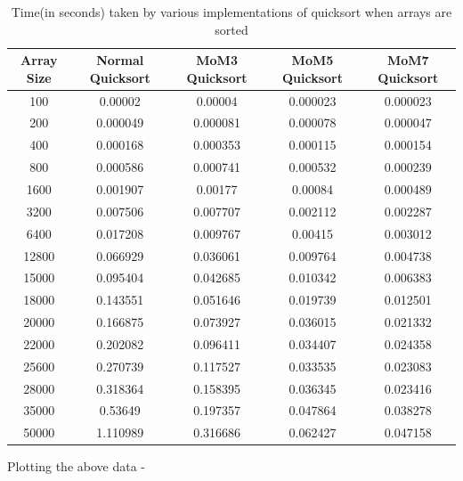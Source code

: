 \documentclass{report}
\begin{document}
\begin{table}[H]
\centering
\footnotesize %
\begin{tabular}{|c|c|c|c|c|}
\hline
\textbf{Array Size} & \textbf{Normal Quicksort} & \textbf{MoM3 Quicksort} & \textbf{MoM5 Quicksort} & \textbf{MoM7 Quicksort} \\ \hline
100    & 0.00002  & 0.00004  & 0.000023 & 0.000023 \\ \hline
200    & 0.000049 & 0.000081 & 0.000078 & 0.000047 \\ \hline
400    & 0.000168 & 0.000353 & 0.000115 & 0.000154 \\ \hline
800    & 0.000586 & 0.000741 & 0.000532 & 0.000239 \\ \hline
1600   & 0.001907 & 0.00177  & 0.00084  & 0.000489 \\ \hline
3200   & 0.007506 & 0.007707 & 0.002112 & 0.002287 \\ \hline
6400   & 0.017208 & 0.009767 & 0.00415  & 0.003012 \\ \hline
12800  & 0.066929 & 0.036061 & 0.009764 & 0.004738 \\ \hline
15000  & 0.095404 & 0.042685 & 0.010342 & 0.006383 \\ \hline
18000  & 0.143551 & 0.051646 & 0.019739 & 0.012501 \\ \hline
20000  & 0.166875 & 0.073927 & 0.036015 & 0.021332 \\ \hline
22000  & 0.202082 & 0.096411 & 0.034407 & 0.024358 \\ \hline
25600  & 0.270739 & 0.117527 & 0.033535 & 0.023083 \\ \hline
28000  & 0.318364 & 0.158395 & 0.036345 & 0.023416 \\ \hline
35000  & 0.53649  & 0.197357 & 0.047864 & 0.038278 \\ \hline
50000  & 1.110989 & 0.316686 & 0.062427 & 0.047158 \\ \hline
\end{tabular}
\caption{Time(in seconds) taken by various implementations of quicksort when arrays are sorted}
\label{table:quicksort_comparison_2}
\end{table}

Plotting the above data - 
\end{document}

